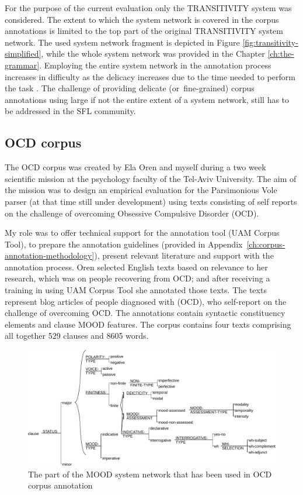    For the purpose of the current evaluation only the TRANSITIVITY system was considered. The extent to which the system network is covered in the corpus annotations is limited to the top part of the original TRANSITIVITY system network. The used system network fragment is depicted in Figure \ref{fig:transitivity-simplified}, while the whole system network was provided in the Chapter \ref{ch:the-grammar}. Employing the entire system network in the annotation process increases in difficulty as the delicacy increases due to the time needed to perform the task \citep[33]{mcenery2006corpus}. The challenge of providing delicate \mbox{(or fine-grained)} corpus annotations using large if not the entire extent of a system network, still has to be addressed in the SFL community. 

\subsection{OCD corpus}

     The OCD corpus was created by Ela Oren and myself during a two week scientific mission at the psychology faculty of the Tel-Aviv University. The aim of the mission was to design an empirical evaluation for the Parsimonious Vole parser (at that time still under development) using texts consisting of self reports on the challenge of overcoming Obsessive Compulsive Disorder (OCD).
     
     My role was to offer technical support for the annotation tool (UAM Corpus Tool), to prepare the annotation guidelines (provided in \mbox{Appendix \ref{ch:corpus-annotation-methodology}}), present relevant literature and support with the annotation process. Oren selected English texts based on relevance to her research, which was on people recovering from OCD; and after receiving a training in using UAM Corpus Tool she annotated those texts. The texts represent blog articles of people diagnosed with (OCD), who self-report on the challenge of overcoming OCD. The annotations contain syntactic constituency elements and clause MOOD features. The corpus contains four texts comprising all together 529 clauses and 8605 words. 

    \begin{figure}[!h]
        \centering
        \includegraphics[width=.85\textwidth]{Figures/Evaluation/ocd1-mood-simplified.pdf}
        \caption{The part of the MOOD system network that has been used in OCD corpus annotation}
        \label{fig:mood-ocd-simplified}
    \end{figure}
    
